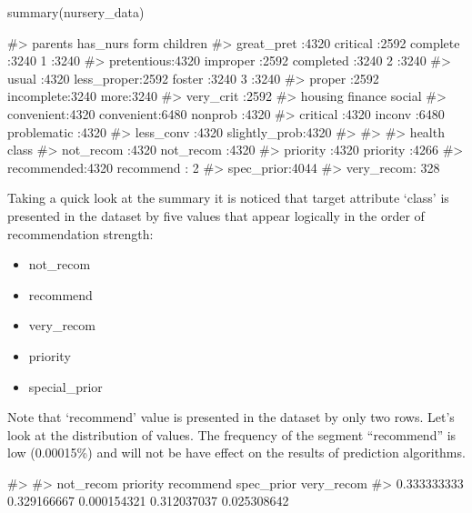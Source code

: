 \begin{Schunk}
\begin{Sinput}
summary(nursery_data)
\end{Sinput}
\begin{Soutput}
#>         parents            has_nurs            form      children   
#>  great_pret :4320   critical   :2592   complete  :3240   1   :3240  
#>  pretentious:4320   improper   :2592   completed :3240   2   :3240  
#>  usual      :4320   less_proper:2592   foster    :3240   3   :3240  
#>                     proper     :2592   incomplete:3240   more:3240  
#>                     very_crit  :2592                                
#>        housing           finance               social    
#>  convenient:4320   convenient:6480   nonprob      :4320  
#>  critical  :4320   inconv    :6480   problematic  :4320  
#>  less_conv :4320                     slightly_prob:4320  
#>                                                          
#>                                                          
#>          health            class     
#>  not_recom  :4320   not_recom :4320  
#>  priority   :4320   priority  :4266  
#>  recommended:4320   recommend :   2  
#>                     spec_prior:4044  
#>                     very_recom: 328
\end{Soutput}
\end{Schunk}

Taking a quick look at the summary it is noticed that target attribute
`class' is presented in the dataset by five values that appear logically
in the order of recommendation strength:

\begin{itemize}
\tightlist
\item
  not\_recom
\item
  recommend
\item
  very\_recom
\item
  priority
\item
  special\_prior
\end{itemize}

Note that `recommend' value is presented in the dataset by only two
rows. Let's look at the distribution of values. The frequency of the
segment ``recommend'' is low (0.00015\%) and will not be have effect on
the results of prediction algorithms.

\begin{Schunk}
\begin{Soutput}
#> 
#>   not_recom    priority   recommend  spec_prior  very_recom 
#> 0.333333333 0.329166667 0.000154321 0.312037037 0.025308642
\end{Soutput}
\end{Schunk}


